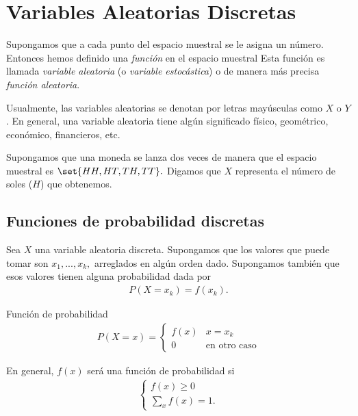 \chapter{Variables Aleatorias Discretas}


Supongamos que a cada punto del espacio muestral se le asigna un número.  Entonces hemos definido una \emph{función} en el espacio muestral  Esta función es llamada \emph{variable aleatoria} (o \emph{variable estocástica}) o de manera más precisa \emph{función aleatoria}. 


Usualmente, las variables aleatorias se denotan por letras mayúsculas como $X$ o $Y$. En general, una variable aleatoria tiene algún significado físico, geométrico, económico, financieros, etc.



\begin{ejemplo}
  \label{exmp:0.2.1}
Supongamos que una moneda se lanza dos veces de manera que el espacio muestral es $\set{HH,HT,TH,TT}.$  Digamos que $X$ representa el número de soles ($H$) que obtenemos.
\end{ejemplo}


\section{Funciones de probabilidad discretas}

 Sea $X$ una variable aleatoria discreta.  Supongamos que los valores que puede tomar son $x_{1},...,x_{k},$ arreglados en algún orden dado.  Supongamos también que esos valores
 tienen alguna probabilidad dada por
 \begin{align}
 \label{eq:0.2.1}
 	P(X=x_{k})=f(x_{k}).
 \end{align}


{Función de probabilidad}
\begin{align}
\label{eq:0.2.2}
P(X=x)=
\begin{cases}
f(x) & x=x_{k} \\
0	& \text{en otro caso}
\end{cases}
\end{align}



	En general, $f(x)$ será una función de probabilidad si
	\begin{align}
		\begin{cases}
			f(x)\geq 0 \\
			\sum_{x}f(x)=1.
		\end{cases}
	\end{align}



